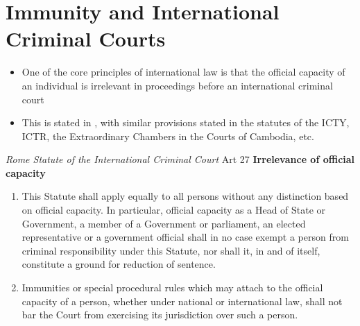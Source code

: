 \section{Immunity and International Criminal Courts}
\begin{itemize}
    \item One of the core principles of international law is that the official capacity of an individual is irrelevant in proceedings before an international criminal court
    \item This is stated in , with similar provisions stated in the statutes of the ICTY, ICTR, the Extraordinary Chambers in the Courts of Cambodia, etc.
\end{itemize}

\begin{statutedetails}{\textit{Rome Statute of the International Criminal Court} Art 27}
    \flushleft
    \textbf{Irrelevance of official capacity}
    \begin{enumerate}
        \item This Statute shall apply equally to all persons without any distinction based on official capacity. In particular, official capacity as a Head of State or Government, a member of a Government or parliament, an elected representative or a government official shall in no case exempt a person from criminal responsibility under this Statute, nor shall it, in and of itself, constitute a ground for reduction of sentence. 
        \item Immunities or special procedural rules which may attach to the official capacity of a person, whether under national or international law, shall not bar the Court from exercising its jurisdiction over such a person.
    \end{enumerate}
\end{statutedetails}

